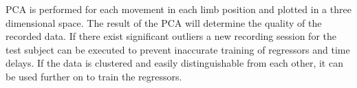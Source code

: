 
PCA is performed for each movement in each limb position and plotted in a three dimensional space. The result of the PCA will determine the quality of the recorded data. If there exist significant outliers a new recording session for the test subject can be executed to prevent inaccurate training of regressors and time delays. If the data is clustered and easily distinguishable from each other, it can be used further on to train the regressors.


%
%





